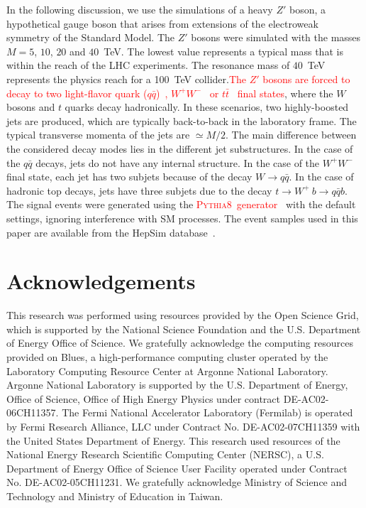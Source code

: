 \documentclass[final,1p,11pt]{elsarticle}
\newcommand{\pythia} {\textsc{Pythia8~}}
\begin{document}
In the following discussion, we use the simulations of a heavy $Z'$ boson, 
a hypothetical gauge boson  that arises from extensions of the electroweak symmetry of the Standard Model.
The $Z'$ bosons were simulated with the masses $M=5$, $10$, $20$ and $40$~TeV. The lowest value 
represents a typical mass that is within the reach of the LHC experiments. The  resonance mass of $40$~TeV 
represents the physics reach for a  100~TeV collider.\textcolor{red}{The $Z'$ bosons are forced to decay to two light-flavor quark ($q\bar{q}$)~\cite{Sirunyan:2018xlo}, $W^+W^-$~\cite{Sirunyan:2017acf} or $t\bar{t}$~\cite{Sirunyan:2018ryr} final states}, where the 
$W$ bosons and $t$ quarks decay hadronically. In these scenarios, two highly-boosted
jets are produced,  which are typically back-to-back in the laboratory frame.
The typical transverse momenta of the jets are $\simeq M/2$.
The main difference between the considered decay modes lies in the different jet substructures. In the case of the $q\bar{q}$ decays,
jets do not have any internal structure. In the case of the $W^+W^-$ final state, each jet has two subjets  because of the decay $W\rightarrow q\bar{q}$. In the case of hadronic top decays, jets have three subjets due
to the decay $t \rightarrow  W^+\>b \rightarrow q\bar{q} b$.    
The signal events were generated using the \textcolor{red}{\pythia generator~\cite{Sjostrand:2006za}} with the default settings,
ignoring interference with SM processes.
The event samples used in this paper are  available from the
HepSim  database~\cite{Chekanov:2014fga}.














\section*{Acknowledgements}
This research was performed using resources provided by the Open Science Grid,
which is supported by the National Science Foundation and the U.S. Department of Energy Office of Science. 
We gratefully acknowledge the computing resources provided on Blues, 
a high-performance computing cluster operated by the Laboratory Computing Resource Center at Argonne National Laboratory.
Argonne National Laboratory is supported by the U.S. Department of Energy, Office of Science, Office of High Energy Physics  under contract DE-AC02-06CH11357. The Fermi National Accelerator Laboratory (Fermilab) is operated by Fermi Research Alliance, LLC under Contract No. DE-AC02-07CH11359 with the United States Department of Energy.
This research used resources of the National Energy Research Scientific  Computing Center (NERSC), a U.S. Department of Energy Office of Science  User Facility operated under Contract No. DE-AC02-05CH11231. We gratefully acknowledge Ministry of Science and Technology and Ministry of Education in Taiwan.
\end{document}
